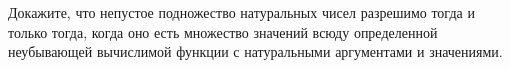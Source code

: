 Докажите, что непустое подножество натуральных чисел разрешимо тогда и только тогда, когда оно есть множество значений всюду
определенной неубывающей вычислимой функции с натуральными аргументами и значениями.